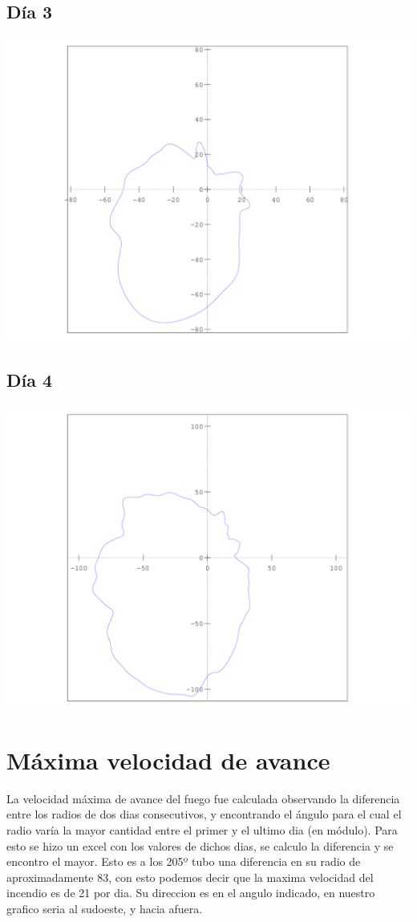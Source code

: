 \documentclass[12pt,spanish]{article}
\begin{document}
\subsection*{Día 3}
\includegraphics[scale=0.7]{../salida/dia3.png}
\subsection*{Día 4}
\includegraphics[scale=0.7]{../salida/dia4.png}

\section*{Máxima velocidad de avance}
La velocidad máxima de avance del fuego fue calculada observando la diferencia entre los radios de dos dias consecutivos, y encontrando el ángulo para el cual el radio varía la mayor cantidad entre el primer y el ultimo dia (en módulo).
Para esto se hizo un excel con los valores de dichos dias, se calculo la diferencia y se encontro el mayor.
Esto es a los 205º tubo una diferencia en su radio de aproximadamente 83, con esto podemos decir que la maxima velocidad del incendio es de 21 por dia.
Su direccion es en el angulo indicado, en nuestro grafico seria al sudoeste, y hacia afuera. 
\end{document}
